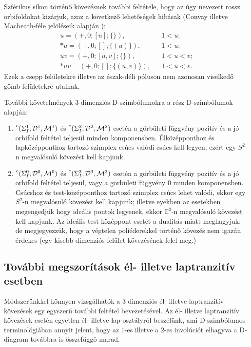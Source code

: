 \documentclass[12pt,magyar,a4paper]{article}
\newcommand{\leftexp}[2]{{\vphantom{#2}}^{#1}{#2}}
\begin{document}
Szférikus síkon történő kövezésnek további feltétele, hogy az úgy nevezett
rossz orbifoldokat kizárjuk, azaz a következő lehetőségek hibásak (Convay
illetve Macbeath-féle jelöléseik alapján \cite{CM}):
\begin{align*}
  u=(+,0;[u];\{\}), & & 1<u;\\
  *u=(+,0;[];\{(u)\}), & & 1<u;\\
  uv=(+,0;[u,v];\{\}), & & 1<u<v;\\
  *uv=(+,0;[];\{(u,v)\}), & & 1<u<v.
\end{align*}
Ezek a csepp felületekre illetve az észak-déli póluson nem azonosan viselkedő
gömb felületekre utalnak.

További követelmények $3$-dimenziós D-szimbólumokra a rész D-szimbólumok alapján:
\begin{enumerate}                                                                                    
  \item $\leftexp{c}(\Sigma_I^1,\mathcal{D}^1,\mathcal{M}^1)$ és
    $\leftexp{c}(\Sigma_I^2,\mathcal{D}^2,\mathcal{M}^2)$ esetén a görbületi
    függvény pozitív és a jó orbifold feltétel teljesül minden komponensben.
    Élközépponthoz és lapközépponthoz tartozó szimplex csúcs valódi csúcs kell
    legyen, ezért egy $S^2$-n megvalósuló kövezést kell kapjunk.
  \item $\leftexp{c}(\Sigma_I^0,\mathcal{D}^0,\mathcal{M}^0)$ és
    $\leftexp{c}(\Sigma_I^3,\mathcal{D}^3,\mathcal{M}^3)$ esetén a görbületi függvény
    pozitív és a jó orbifold feltétel teljesül, vagy a görbületi függvény
    $0$ minden komponensben. Csúcshoz és test-középponthoz tartozó szimplex csúcs
    lehet valódi, ekkor egy $S^2$-n megvalósuló kövezést kell kapjunk; illetve
    eyekben az esetekben megengedjük hogy ideális pontok legyenek, ekkor
    $\mathbb{E}^2$-n megvalósuló kövezést kell kapjunk. Az ideális
    test-középpont esetét a dualitás miatt meghagyjuk; de megjegyezzük, hogy a
    végtelen poliéderekkel történő kövezés nem igazán érdekes (egy kisebb
    dimenziós felület kövezésének felel meg.)
\end{enumerate}

\subsection{További megszorítások él- illetve laptranzitív esetben}
Módszerünkkel könnyen vizsgálhatók a $3$ dimenziós él- illetve laptranzitív
kövezések egy egyszerű további feltétel bevezetésével. Az él- illetve
laptranzitív kövezések esetén egyetlen él- illetve lap-osztályról beszélünk, ami
D-szimbólumos terminológiában annyit jelent, hogy az $1$-es illetve a $2$-es
involúciót elhagyva a D-diagram továbbra is összefüggő marad.
\end{document}
